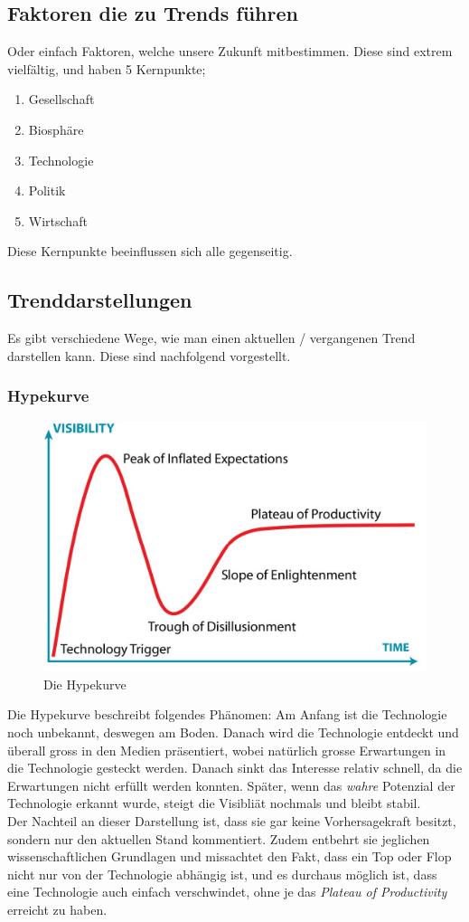 \subsection{Faktoren die zu Trends führen}
Oder einfach Faktoren, welche unsere Zukunft mitbestimmen. Diese sind extrem vielfältig, und haben 5 Kernpunkte;
\begin{enumerate}
	\item Gesellschaft
	\item Biosphäre
	\item Technologie
	\item Politik
	\item Wirtschaft
\end{enumerate}
Diese Kernpunkte beeinflussen sich alle gegenseitig.
\subsection{Trenddarstellungen}
Es gibt verschiedene Wege, wie man einen aktuellen / vergangenen Trend darstellen kann. Diese sind nachfolgend vorgestellt.
\subsubsection{Hypekurve}
\begin{figure}[h!]
\centering
\includegraphics[width=0.7\linewidth]{fig/hype_kurve}
\caption{Die Hypekurve}
\label{fig:hype_kurve}
\end{figure}
Die Hypekurve beschreibt folgendes Phänomen: Am Anfang ist die Technologie noch unbekannt, deswegen am Boden. Danach wird die Technologie entdeckt und überall gross in den Medien präsentiert, wobei natürlich grosse Erwartungen in die Technologie gesteckt werden. Danach sinkt das Interesse relativ schnell, da die Erwartungen nicht erfüllt werden konnten. Später, wenn das \textit{wahre} Potenzial der Technologie erkannt wurde, steigt die Visibliät nochmals und bleibt stabil. \\
Der Nachteil an dieser Darstellung ist, dass sie gar keine Vorhersagekraft besitzt, sondern nur den aktuellen Stand kommentiert. Zudem entbehrt sie jeglichen wissenschaftlichen Grundlagen und missachtet den Fakt, dass ein Top oder Flop nicht nur von der Technologie abhängig ist, und es durchaus möglich ist, dass eine Technologie auch einfach verschwindet, ohne je das \textit{Plateau of Productivity} erreicht zu haben.
